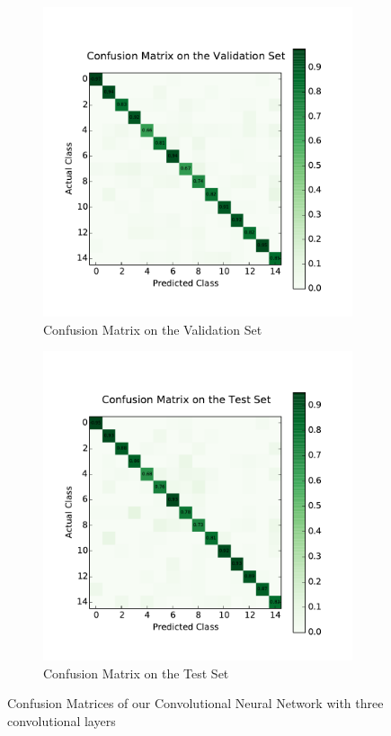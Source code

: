 \begin{figure}
	\centering
	\begin{subfigure}[b]{0.45\linewidth}
		\centering
		\includegraphics[width=\linewidth]{images/3/cm_valid.pdf}
		\caption{Confusion Matrix on the Validation Set}
	\end{subfigure}
	\hfill
	\begin{subfigure}[b]{0.45\linewidth}
		\centering
		\includegraphics[width=\linewidth]{images/3/cm_test.pdf}
		\caption{Confusion Matrix on the Test Set}
	\end{subfigure}
	\caption{Confusion Matrices of our Convolutional Neural Network with three convolutional layers}
	\label{cnn_cm}
\end{figure}
